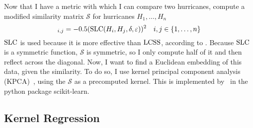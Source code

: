 \par
Now that I have a metric with which I can compare two hurricanes, compute a modified similarity matrix $\mathcal{S}$ for hurricanes $H_{1},\ldots,H_{n}$
\begin{equation*}
	[\mathcal{S}]_{i,j}=-0.5(\SLC(H_{i},H_{j},\delta,\varepsilon))^{2}\quad{}i,j\in\set{1,\ldots,n}
\end{equation*}
$\operatorname{SLC}$ is used because it is more effective than $\operatorname{LCSS}$, according to \cite{ho2015manifold}.
Because $\operatorname{SLC}$ is a symmetric function, $\mathcal{S}$ is symmetric, so I only compute half of it and then reflect across the diagonal.
Now, I want to find a Euclidean embedding of this data, given the similarity.
To do so, I use kernel principal component analysis (KPCA)~\cite{scholkopf1997kernel}, using the $\mathcal{S}$ as a precomputed kernel.
This is implemented by~\cite{scikit-learn} in the python package scikit-learn.

\subsection{Kernel Regression}